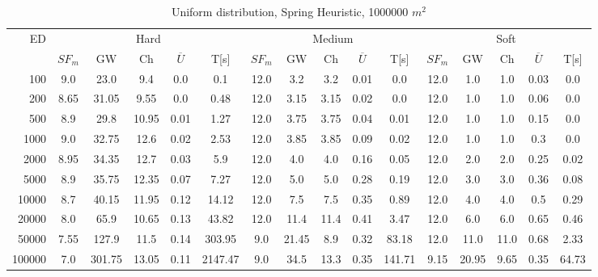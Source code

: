 \begin{table}[htb]
	\centering
	\begin{tabular}{|r|c|c|c|c|c|c|c|c|c|c|c|c|c|c|c|} 
		\multirow{2}{*}{ED} & \multicolumn{5}{c|}{Hard} & \multicolumn{5}{c|}{Medium} &\multicolumn{5}{c|}{Soft} \\ 
		\cline{2-16} 
		&$SF_{m}$&GW & Ch & $\overline{U}$&T[s] &$SF_{m}$&GW & Ch & $\overline{U}$ &T[s] &$SF_{m}$&GW & Ch & $\overline{U}$  & T[s]  \\ 
		\hline 
		100 & 9.0 & 23.0 & 9.4 & 0.0 & 0.1 & 12.0 & 3.2 & 3.2 & 0.01 & 0.0 & 12.0 & 1.0 & 1.0 & 0.03 & 0.0\\ 
		200 & 8.65 & 31.05 & 9.55 & 0.0 & 0.48 & 12.0 & 3.15 & 3.15 & 0.02 & 0.0 & 12.0 & 1.0 & 1.0 & 0.06 & 0.0\\ 
		500 & 8.9 & 29.8 & 10.95 & 0.01 & 1.27 & 12.0 & 3.75 & 3.75 & 0.04 & 0.01 & 12.0 & 1.0 & 1.0 & 0.15 & 0.0\\ 
		1000 & 9.0 & 32.75 & 12.6 & 0.02 & 2.53 & 12.0 & 3.85 & 3.85 & 0.09 & 0.02 & 12.0 & 1.0 & 1.0 & 0.3 & 0.0\\ 
		2000 & 8.95 & 34.35 & 12.7 & 0.03 & 5.9 & 12.0 & 4.0 & 4.0 & 0.16 & 0.05 & 12.0 & 2.0 & 2.0 & 0.25 & 0.02\\ 
		5000 & 8.9 & 35.75 & 12.35 & 0.07 & 7.27 & 12.0 & 5.0 & 5.0 & 0.28 & 0.19 & 12.0 & 3.0 & 3.0 & 0.36 & 0.08\\ 
		10000 & 8.7 & 40.15 & 11.95 & 0.12 & 14.12 & 12.0 & 7.5 & 7.5 & 0.35 & 0.89 & 12.0 & 4.0 & 4.0 & 0.5 & 0.29\\ 
		20000 & 8.0 & 65.9 & 10.65 & 0.13 & 43.82 & 12.0 & 11.4 & 11.4 & 0.41 & 3.47 & 12.0 & 6.0 & 6.0 & 0.65 & 0.46\\ 
		50000 & 7.55 & 127.9 & 11.5 & 0.14 & 303.95 & 9.0 & 21.45 & 8.9 & 0.32 & 83.18 & 12.0 & 11.0 & 11.0 & 0.68 & 2.33\\ 
		100000 & 7.0 & 301.75 & 13.05 & 0.11 & 2147.47 & 9.0 & 34.5 & 13.3 & 0.35 & 141.71 & 9.15 & 20.95 & 9.65 & 0.35 & 64.73\\ 
		\hline 
	\end{tabular} 
	\caption{Uniform distribution, Spring Heuristic, 1000000 $m^2$} 
	\label{tab:UnSprings1000} 
\end{table} 
